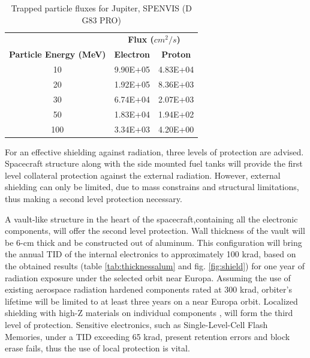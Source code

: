 \begin{table}[h]
  \centering
    \begin{tabular}{|c|c|c|}
    \hline
    \textbf{} & \multicolumn{2}{c|}{\textbf{Flux ($cm^2/s$)}} \bigstrut\\
\cline{2-3}    \textbf{Particle Energy (MeV)} & \textbf{Electron} & \textbf{Proton} \bigstrut\\
    \hline
    10    & 9.90E+05 & 4.83E+04 \bigstrut\\
    \hline
    20    & 1.92E+05 & 8.36E+03 \bigstrut\\
    \hline
    30    & 6.74E+04 & 2.07E+03 \bigstrut\\
    \hline
    50    & 1.83E+04 & 1.94E+02 \bigstrut\\
    \hline
    100   & 3.34E+03 & 4.20E+00 \bigstrut\\
    \hline
    \end{tabular}%
    \caption{Trapped particle fluxes for Jupiter, SPENVIS (D G83 PRO)}
    \label{tab:particleflux}
\end{table}%

For an effective shielding against radiation, three levels of protection are advised. Spacecraft structure along with the side mounted fuel tanks will provide the first level collateral protection against the external radiation. However, external shielding can only be limited, due to mass constrains and structural limitations, thus making a second level protection necessary. 

A vault-like structure in the heart of the spacecraft,containing all the electronic components, will offer the second level protection. Wall thickness of the vault will be 6-cm thick and be constructed out of aluminum. This configuration will bring the annual TID of the internal electronics to approximately 100 krad, based on the obtained results (table \ref{tab:thicknessalum} and fig. \ref{fig:shield}) for one year of radiation exposure under the selected orbit near Europa. Assuming the use of existing aerospace radiation hardened components rated at 300 krad, orbiter's lifetime will be limited to at least three years on a near Europa orbit. Localized shielding with high-Z materials on individual components , will form the third level of protection. Sensitive electronics, such as Single-Level-Cell Flash Memories, under a TID exceeding 65 krad, present retention errors and block erase fails, thus the use of local protection is vital. 
 
